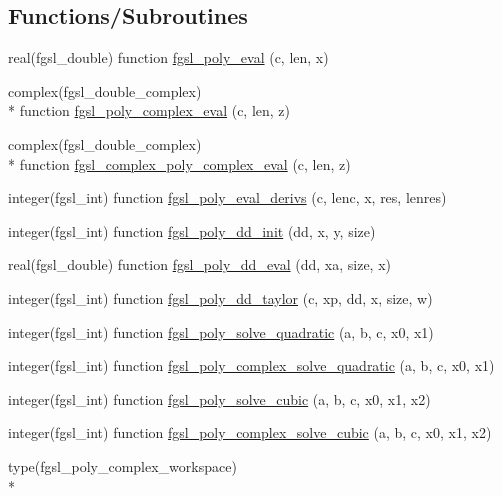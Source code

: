 \subsection*{Functions/\-Subroutines}
\begin{DoxyCompactItemize}
\item 
real(fgsl\-\_\-double) function \hyperlink{poly_8finc_a32cfccd5af1c4b4ce6a1388b521a0e39}{fgsl\-\_\-poly\-\_\-eval} (c, len, x)
\item 
complex(fgsl\-\_\-double\-\_\-complex) \\*
function \hyperlink{poly_8finc_a1e0f019e7c97edb4e583364364479259}{fgsl\-\_\-poly\-\_\-complex\-\_\-eval} (c, len, z)
\item 
complex(fgsl\-\_\-double\-\_\-complex) \\*
function \hyperlink{poly_8finc_a5b484057f9e034d5b22a61812027ef71}{fgsl\-\_\-complex\-\_\-poly\-\_\-complex\-\_\-eval} (c, len, z)
\item 
integer(fgsl\-\_\-int) function \hyperlink{poly_8finc_aab1c2603aacb50d82b93adcd88cbb307}{fgsl\-\_\-poly\-\_\-eval\-\_\-derivs} (c, lenc, x, res, lenres)
\item 
integer(fgsl\-\_\-int) function \hyperlink{poly_8finc_a76d3df1330a37af57601ec4480061f52}{fgsl\-\_\-poly\-\_\-dd\-\_\-init} (dd, x, y, size)
\item 
real(fgsl\-\_\-double) function \hyperlink{poly_8finc_ab036239b25d0a9bd95ac747d71c48b8b}{fgsl\-\_\-poly\-\_\-dd\-\_\-eval} (dd, xa, size, x)
\item 
integer(fgsl\-\_\-int) function \hyperlink{poly_8finc_ab629459414b3347907c9a0559b75bf64}{fgsl\-\_\-poly\-\_\-dd\-\_\-taylor} (c, xp, dd, x, size, w)
\item 
integer(fgsl\-\_\-int) function \hyperlink{poly_8finc_a21062b0907ae31ffc799938513ebae02}{fgsl\-\_\-poly\-\_\-solve\-\_\-quadratic} (a, b, c, x0, x1)
\item 
integer(fgsl\-\_\-int) function \hyperlink{poly_8finc_afe315cb11581a666f03d0c9f2dc78233}{fgsl\-\_\-poly\-\_\-complex\-\_\-solve\-\_\-quadratic} (a, b, c, x0, x1)
\item 
integer(fgsl\-\_\-int) function \hyperlink{poly_8finc_ae68c5a984c47341773668044f141ce19}{fgsl\-\_\-poly\-\_\-solve\-\_\-cubic} (a, b, c, x0, x1, x2)
\item 
integer(fgsl\-\_\-int) function \hyperlink{poly_8finc_a4f38dcb84e7589b62c5419ec6f5816ca}{fgsl\-\_\-poly\-\_\-complex\-\_\-solve\-\_\-cubic} (a, b, c, x0, x1, x2)
\item 
type(fgsl\-\_\-poly\-\_\-complex\-\_\-workspace) \\*

\end{DoxyCompactItemize}
